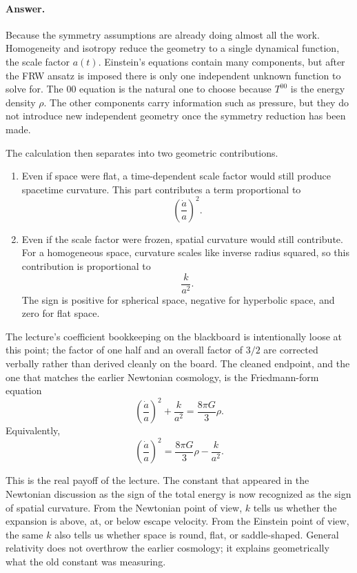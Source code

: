 \paragraph{Answer.} Because the symmetry assumptions are already doing almost all the work. Homogeneity and isotropy reduce the geometry to a single dynamical function, the scale factor \(a(t)\). Einstein's equations contain many components, but after the FRW ansatz is imposed there is only one independent unknown function to solve for. The \(00\) equation is the natural one to choose because \(T^{00}\) is the energy density \(\rho\). The other components carry information such as pressure, but they do not introduce new independent geometry once the symmetry reduction has been made.

The calculation then separates into two geometric contributions.

\begin{enumerate}
\item Even if space were flat, a time-dependent scale factor would still produce spacetime curvature. This part contributes a term proportional to
\[
\left(\frac{\dot a}{a}\right)^2.
\]

\item Even if the scale factor were frozen, spatial curvature would still contribute. For a homogeneous space, curvature scales like inverse radius squared, so this contribution is proportional to
\[
\frac{k}{a^2}.
\]
The sign is positive for spherical space, negative for hyperbolic space, and zero for flat space.
\end{enumerate}

The lecture's coefficient bookkeeping on the blackboard is intentionally loose at this point; the factor of one half and an overall factor of \(3/2\) are corrected verbally rather than derived cleanly on the board. The cleaned endpoint, and the one that matches the earlier Newtonian cosmology, is the Friedmann-form equation
\begin{equation}
\left(\frac{\dot a}{a}\right)^2+\frac{k}{a^2}=\frac{8\pi G}{3}\rho.
\end{equation}
Equivalently,
\begin{equation}
\left(\frac{\dot a}{a}\right)^2=\frac{8\pi G}{3}\rho-\frac{k}{a^2}.
\end{equation}

This is the real payoff of the lecture. The constant that appeared in the Newtonian discussion as the sign of the total energy is now recognized as the sign of spatial curvature. From the Newtonian point of view, \(k\) tells us whether the expansion is above, at, or below escape velocity. From the Einstein point of view, the same \(k\) also tells us whether space is round, flat, or saddle-shaped. General relativity does not overthrow the earlier cosmology; it explains geometrically what the old constant was measuring.

